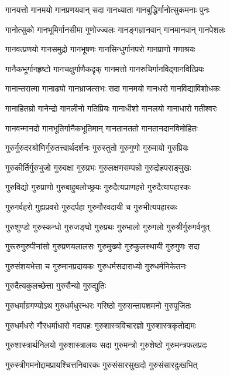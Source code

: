 \twolineshloka
{गानयत्तो गानमयो गानप्रणयवान् सदा}%
{गानध्याता गानबुद्धिर्गानोत्सुकमनाः पुनः}%

\twolineshloka
{गानोत्सुको गानभूमिर्गानसीमा गुणोज्ज्वलः}%
{गानङ्गज्ञानवान् गानमानवान् गानपेशलः}%

\twolineshloka
{गानवत्प्रणयो गानसमुद्रो गानभूषणः}%
{गानसिन्धुर्गानपरो गानप्राणो गणाश्रयः}%

\twolineshloka
{गानैकभूर्गानहृष्टो गानचक्षुर्गाणैकदृक्}%
{गानमत्तो गानरुचिर्गानविद्गानवित्प्रियः}%

\twolineshloka
{गानान्तरात्मा गानाढ्यो गानभ्राजत्सभः सदा}%
{गानमयो गानधरो गानविद्याविशोधकः}%

\twolineshloka
{गानाहितघ्रो गानेन्द्रो गानलीनो गतिप्रियः}%
{गानाधीशो गानलयो गानाधारो गतीश्वरः}%

\twolineshloka
{गानवन्मानदो गानभूतिर्गानैकभूतिमान्}%
{गानतानततो गानतानदानविमोहितः}%

\twolineshloka
{गुरुर्गुरुदरश्रोणिर्गुरुतत्त्वार्थदर्शनः}%
{गुरुस्तुतो गुरुगुणो गुरुमायो गुरुप्रियः}%

\twolineshloka
{गुरुकीर्तिर्गुरुभुजो गुरुवक्षा गुरुप्रभः}%
{गुरुलक्षणसम्पन्नो गुरुद्रोहपराङ्मुखः}%

\twolineshloka
{गुरुविद्यो गुरुप्राणो गुरुबाहुबलोच्छ्रयः}%
{गुरुदैत्यप्राणहरो गुरुदैत्यापहारकः}%

\twolineshloka
{गुरुगर्वहरो गुह्यप्रवरो गुरुदर्पहा}%
{गुरुगौरवदायी च गुरुभीत्यपहारकः}%

\twolineshloka
{गुरुशुण्डो गुरुस्कन्धो गुरुजङ्घो गुरुप्रथः}%
{गुरुभालो गुरुगलो गुरुश्रीर्गुरुगर्वनुत्}

\twolineshloka
{गुरूरुगुरुपीनांसो गुरुप्रणयलालसः}%
{गुरुमुख्यो गुरुकुलस्थायी गुरुगुणः सदा}%

\twolineshloka
{गुरुसंशयभेत्ता च गुरुमानप्रदायकः}%
{गुरुधर्मसदाराध्यो गुरुधर्मनिकेतनः}%

\onelineshloka
{गुरुदैत्यकुलच्छेत्ता गुरुसैन्यो गुरुद्युतिः}

\twolineshloka
{गुरुधर्माग्रगण्योऽथ गुरुधर्मधुरन्धरः}%
{गरिष्ठो गुरुसन्तापशमनो गुरुपूजितः}%

\twolineshloka
{गुरुधर्मधरो गौरधर्माधारो गदापहः}%
{गुरुशास्त्रविचारज्ञो गुरुशास्त्रकृतोद्यमः}%

\twolineshloka
{गुरुशास्त्रार्थनिलयो गुरुशास्त्रालयः सदा}%
{गुरुमन्त्रो गुरुशेष्ठो गुरुमन्त्रफलप्रदः}%

\twolineshloka
{गुरुस्त्रीगमनोद्दामप्रायश्चित्तनिवारकः}%
{गुरुसंसारसुखदो गुरुसंसारदुःखभित्}%

